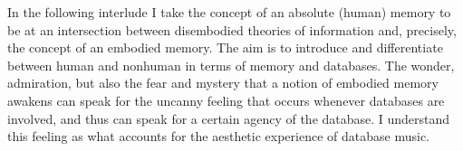 In the following interlude I take the concept of an absolute (human) memory to be at an intersection between disembodied theories of information and, precisely, the concept of an embodied memory. The aim is to introduce and differentiate between human and nonhuman in terms of memory and databases. The wonder, admiration, but also the fear and mystery that a notion of embodied memory awakens can speak for the uncanny feeling that occurs whenever databases are involved, and thus can speak for a certain agency of the database. I understand this feeling as what accounts for the aesthetic experience of database music. 





